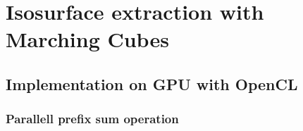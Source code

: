 \chapter{Isosurface extraction with Marching Cubes}
\section{Implementation on GPU with OpenCL}
\subsection{Parallell prefix sum operation}
